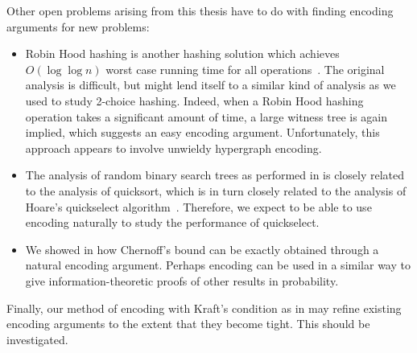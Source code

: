 Other open problems arising from this thesis have to do with finding
encoding arguments for new problems:
\begin{itemize}
\item Robin Hood hashing is another hashing solution which achieves
  $O(\log \log n)$ worst case running time for all
  operations~\cite{devroye:robin}. The original analysis is difficult,
  but might lend itself to a similar kind of analysis as we used to
  study 2-choice hashing. Indeed, when a Robin Hood hashing operation
  takes a significant amount of time, a large witness tree is again
  implied, which suggests an easy encoding argument. Unfortunately,
  this approach appears to involve unwieldy hypergraph encoding.

\item The analysis of random binary search trees as performed in
   is closely related to the analysis of quicksort,
  which is in turn closely related to the analysis of Hoare's
  quickselect algorithm~\cite{hoare:find}. Therefore, we expect to be
  able to use encoding naturally to study the performance of
  quickselect.

\item We showed in  how Chernoff's bound can be
  exactly obtained through a natural encoding argument. Perhaps
  encoding can be used in a similar way to give information-theoretic
  proofs of other results in probability.
\end{itemize}

Finally, our method of encoding with Kraft's condition as in
 may refine existing encoding arguments to the extent that
they become tight. This should be investigated.

